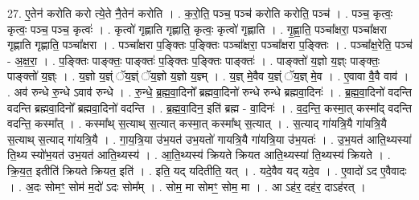 \documentclass[17pt]{extarticle}
\begin{document}
27. ए॒तेन॑ करोति करो त्ये॒ते नै॒तेन॑ करोति । . क॒रो॒ति॒ पञ्च॒ पञ्च॑ करोति करोति॒ पञ्च॑ । . पञ्च॒ कृत्वः॒ कृत्वः॒ पञ्च॒ पञ्च॒ कृत्वः॑ । . कृत्वो॑ गृह्णाति गृह्णाति॒ कृत्वः॒ कृत्वो॑ गृह्णाति । . गृ॒ह्णा॒ति॒ पञ्चा᳚क्षरा॒ पञ्चा᳚क्षरा गृह्णाति गृह्णाति॒ पञ्चा᳚क्षरा । . पञ्चा᳚क्षरा प॒ङ्क्तिः प॒ङ्क्तिः पञ्चा᳚क्षरा॒ पञ्चा᳚क्षरा प॒ङ्क्तिः । . पञ्चा᳚क्ष॒रेति॒ पञ्च॑ - अ॒क्ष॒रा॒ । . प॒ङ्क्तिः पाङ्क्तः॒ पाङ्क्तः॑ प॒ङ्क्तिः प॒ङ्क्तिः पाङ्क्तः॑ । . पाङ्क्तो॑ य॒ज्ञो य॒ज्ञ्ः पाङ्क्तः॒ पाङ्क्तो॑ य॒ज्ञ्ः । . य॒ज्ञो य॒ज्ञ्ं ॅय॒ज्ञ्ं ॅय॒ज्ञो य॒ज्ञो य॒ज्ञ्म् । . य॒ज्ञ् मे॒वैव य॒ज्ञ्ं ॅय॒ज्ञ् मे॒व । . ए॒वावा वै॒वै वाव॑ । . अव॑ रुन्धे रु॒न्धे ऽवाव॑ रुन्धे । . रु॒न्धे॒ ब्र॒ह्म॒वा॒दिनो᳚ ब्रह्मवा॒दिनो॑ रुन्धे रुन्धे ब्रह्मवा॒दिनः॑ । . ब्र॒ह्म॒वा॒दिनो॑ वदन्ति वदन्ति ब्रह्मवा॒दिनो᳚ ब्रह्मवा॒दिनो॑ वदन्ति । . ब्र॒ह्म॒वा॒दिन॒ इति॑ ब्रह्म - वा॒दिनः॑ । . व॒द॒न्ति॒ कस्मा॒त् कस्मा᳚द् वदन्ति वदन्ति॒ कस्मा᳚त् । . कस्मा᳚थ् स॒त्याथ् स॒त्यात् कस्मा॒त् कस्मा᳚थ् स॒त्यात् । . स॒त्याद् गा॑यत्रि॒यै गा॑यत्रि॒यै स॒त्याथ् स॒त्याद् गा॑यत्रि॒यै । . गा॒य॒त्रि॒या उ॑भ॒यत॑ उभ॒यतो॑ गायत्रि॒यै गा॑यत्रि॒या उ॑भ॒यतः॑ । . उ॒भ॒यत॑ आति॒थ्यस्या॑ ति॒थ्य स्यो॑भ॒यत॑ उभ॒यत॑ आति॒थ्यस्य॑ । . आ॒ति॒थ्यस्य॑ क्रियते क्रियत आति॒थ्यस्या॑ ति॒थ्यस्य॑ क्रियते । . क्रि॒य॒त॒ इतीति॑ क्रियते क्रियत॒ इति॑ । . इति॒ यद् यदितीति॒ यत् । . यदे॒वैव यद् यदे॒व । . ए॒वादो॑ ऽद ए॒वैवादः । . अ॒दः सोमꣳ॒॒ सोम॑ म॒दो॑ ऽदः सोम᳚म् । . सोम॒ मा सोमꣳ॒॒ सोम॒ मा । . आ ऽह॑र॒ दह॑र॒ दाऽह॑रत् । \newline
\end{document}
